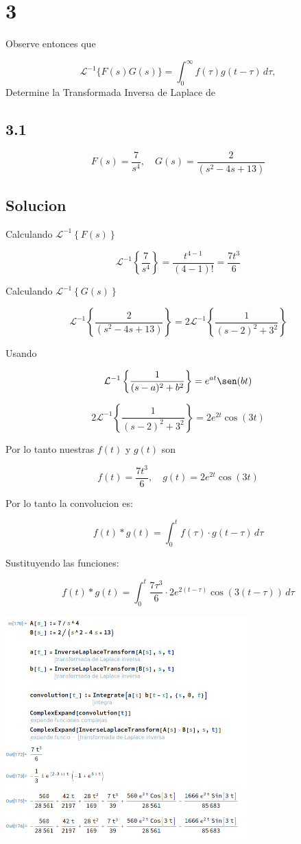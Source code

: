 \documentclass{article}
\begin{document}
\section{3}
Observe entonces que

\[
    \mathcal{L}^{-1}\{F(s)G(s)\} = \int_0^{\infty} f(\tau)g(t - \tau) \, d\tau,
\]
Determine la Transformada Inversa de Laplace de

\subsection{3.1}
\[
    F(s) = \frac{7}{s^4}, \quad G(s) = \frac{2}{(s^2-4s+13)}
\]
\subsection*{Solucion}

Calculando $\mathcal{L}^{-1}\left\{F(s)\right\} $

\[
    \mathcal{L}^{-1}\left\{\frac{7}{s^4}\right\} = \frac{t^{4-1}}{(4-1)!} = \frac{7t^3}{6}
\]

Calculando $\mathcal{L}^{-1}\left\{G(s)\right\} $

\[
    \mathcal{L}^{-1}\left\{\frac{2}{(s^2-4s+13)}\right\} = 2\mathcal{L}^{-1}\left\{\frac{1}{(s-2)^2+3^2}\right\}
\]

Usando

\[
    \mathcal{L}^{-1}\left\{ \frac{1}{(s - a)^2 + b^2} \right\} = e^{at} \sen(bt)
\]

\[
    2\mathcal{L}^{-1}\left\{\frac{1}{(s-2)^2+3^2}\right\} =  2 e^{2t} \cos(3t)
\]

Por lo tanto nuestras $f(t)$ y $g(t)$ son

\[
    f(t) = \frac{7t^3}{6}, \quad g(t) =2 e^{2t} \cos(3t)
\]

Por lo tanto la convolucion es:

\[
    f(t) \ast g(t) = \int_{0}^{t} f(\tau) \cdot g(t - \tau) \, d\tau
\]

Sustituyendo las funciones:

\[
    f(t) \ast g(t) = \int_{0}^{t} \frac{7\tau^3}{6} \cdot 2 e^{2(t - \tau)} \cos(3(t - \tau)) \, d\tau
\]

\begin{center}
    \includegraphics[width=0.7\textwidth]{./image4.png}
\end{center}
\end{document}

